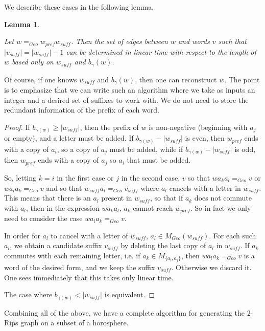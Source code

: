 \documentclass{amsart}
\newtheorem{lemma}[theorem]{Lemma}
\theoremstyle{definition}
\theoremstyle{remark}
\begin{document}
	We describe these cases in the following lemma.
	
	\begin{lemma} \label{RipsEdgesDifferentSuffixLength}
		
		Let $w=_{Geo}w_{pref}w_{suff}$. Then the set of edges between $w$ and words $v$ such that $|v_{suff}|=|w_{suff}|-1$ can be determined in linear time with respect to the length of $w$ based only on $w_{suff}$ and $b_{\gamma}(w)$.
		
	\end{lemma} 
	
	Of course, if one knows $w_{suff}$ and $b_{\gamma}(w)$, then one can reconstruct $w$. The point is to emphasize that we can write such an algorithm where we take as inputs an integer and a desired set of suffixes to work with. We do not need to store the redundant information of the prefix of each word.
	
	\begin{proof}
		
		If $b_{\gamma(w)}\ge|w_{suff}|$, then the prefix of $w$ is non-negative (beginning with $a_j$ or empty), and a letter must be added. If $b_{\gamma(w)}-|w_{suff}|$ is even, then $w_{pref}$ ends with a copy of $a_i$, so a copy of $a_j$ must be added, while if $b_{\gamma(w)}-|w_{suff}|$ is odd, then $w_{pref}$ ends with a copy of $a_j$ so $a_i$ that must be added.
		
		So, letting $k=i$ in the first case or $j$ in the second case, $v$ so that $wa_ka_l=_{Geo}v$ or $w a_l a_k=_{Geo}v$ and so that $w_{suff}a_l=_{Geo}v_{suff}$ where $a_l$ cancels with a letter in $w_{suff}$. This means that there is an $a_l$ present in $w_{suff}$, so that if $a_k$ does not commute with $a_l$, then in the expression $w a_ka_l$, $a_k$ cannot reach $w_{pref}$. So in fact we only need to consider the case $w a_l a_k=_{Geo}v$.
		
		In order for $a_l$ to cancel with a letter of $w_{suff}$, $a_l\in M_{Geo}(w_{suff})$. For each such $a_l$, we obtain a candidate suffix $v_{suff}$ by deleting the last copy of $a_l$ in $w_{suff}$. If $a_k$ commutes with each remaining letter, i.e. if $a_k\in M_{\{a_i, a_j\}}$, then $wa_la_k=_{Geo}v$ is a word of the desired form, and we keep the suffix $v_{suff}$. Otherwise we discard it. One sees immediately that this takes only linear time.
		
		The case where $b_{\gamma(w)}<|w_{suff}|$ is equivalent.
	\end{proof}
	
	Combining all of the above, we have a complete algorithm for generating the $2$-Rips graph on a subset of a horosphere.
	
\end{document}
